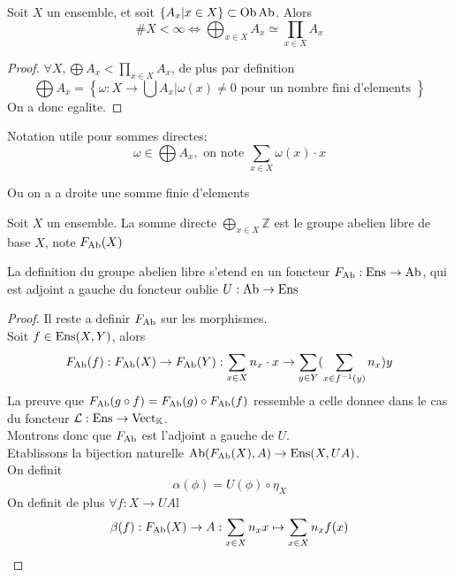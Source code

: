\documentclass[../main.tex]{subfiles}
\begin{document}
\begin{lemma}
Soit $X$ un ensemble, et soit $ \left\{ A_x| x\in X \right\} \subset \operatorname{Ob} \operatorname{Ab}$. Alors
\[ 
\# X < \infty  \iff \bigoplus_{x\in X} A_x \simeq \prod_{x\in X} A_x
\]

\end{lemma}
\begin{proof}
$\forall X, \bigoplus A_x < \prod_{x\in X} A_x$, de plus par definition
\[ 
\bigoplus A_x = \left\{ \omega: X \to \bigcup A_x | \omega( x) \neq 0 \text{ pour un nombre fini d'elements }  \right\} 
\]
On a donc egalite.

\end{proof}
Notation utile pour sommes directes:
\[ 
\omega\in \bigoplus A_x, \text{ on note } \sum_{x\in X} \omega( x) \cdot x
\]

Ou on a a droite une somme finie d'elements	
\begin{defn}
Soit $X$ un ensemble. La somme directe $\bigoplus_{x\in X} \mathbb{Z}$ est le groupe abelien libre de base $X$, note $F_{\operatorname{Ab}} ( X) $ 		
\end{defn}
\begin{thm}
	La definition du groupe abelien libre s'etend en un foncteur $F_{ \operatorname{Ab} }: \operatorname{Ens} \to \operatorname{Ab}$, qui est adjoint a gauche du foncteur oublie $U : \operatorname{Ab} \to \operatorname{Ens}$ 	
\end{thm}
\begin{proof}
Il reste a definir $F_{\operatorname{Ab}} $ sur les morphismes.\\
Soit $f\in \operatorname{Ens}( X,Y) $, alors
\[ 
F_{ \operatorname{Ab} } ( f) : F_{ \operatorname{Ab} }( X) \to F_{ \operatorname{Ab} }( Y): \sum_{x\in X} n_x \cdot x \to \sum_{y\in Y} ( \sum_{x\in f^{-1}( y) } n_x) y
\]
La preuve que $F_{\operatorname{Ab}} ( g\circ f) = F_{ \operatorname{Ab} }( g) \circ F_{ \operatorname{Ab} }( f) $ ressemble a celle donnee dans le cas du foncteur $ \mathcal{L}: \operatorname{Ens} \to \operatorname{Vect}_{\mathbb{K}} $.\\
Montrons donc que $F_{ \operatorname{Ab} }$ est l'adjoint a gauche de $U$.\\
Etablissons la bijection naturelle $\operatorname{Ab}( F_{ \operatorname{Ab} }( X) , A) \to \operatorname{Ens}( X, UA) $.\\
On definit
\[ 
\alpha( \phi) = U( \phi) \circ \eta_X
\]
On definit de plus $\forall f : X \to UA$l
\[ 
\beta( f) : F_{ \operatorname{Ab} }( X) \to A: \sum_{x\in X} n_x x \mapsto \sum_{x\in X} n_x f( x) 
\]


\end{proof}
\end{document}
